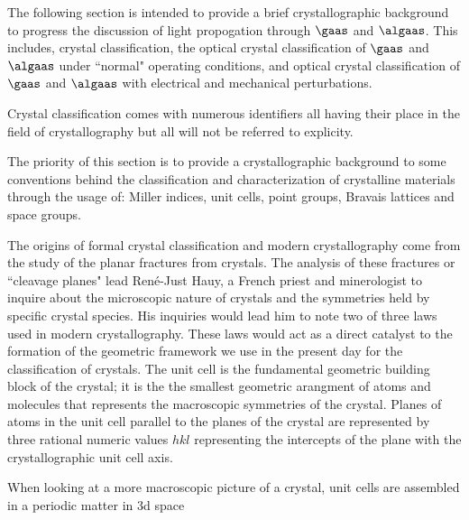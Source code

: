 The following section is intended to provide a brief crystallographic background to progress the discussion of light propogation through $\gaas$ and $\algaas$. This includes, crystal classification, the optical crystal classification of $\gaas$ and $\algaas$ under ``normal" operating conditions, and optical crystal classification of $\gaas$  and $\algaas$ with electrical and mechanical perturbations.

Crystal classification comes with numerous identifiers all having their place in the field of crystallography but all will not be referred to explicity.

The priority of this section is to provide a crystallographic background to some conventions behind the classification and characterization of crystalline materials through the usage of: Miller indices, unit cells, point groups, Bravais lattices and space groups.

The origins of formal crystal classification and modern crystallography come from the study of the planar fractures from crystals. The analysis of these fractures or ``cleavage planes" lead René-Just Hauy, a French priest and minerologist to inquire about the microscopic nature of crystals and the symmetries held by specific crystal species. His inquiries would lead him to note two of three laws used in modern crystallography. These laws would act as a direct catalyst to the formation of the geometric framework we use in the present day for the classification of crystals.
The unit cell is the fundamental geometric building block of the crystal; it is the the smallest geometric arangment of atoms and molecules that represents the macroscopic symmetries of the crystal. Planes of atoms in the unit cell parallel to the planes of the crystal are represented by three rational numeric values ${hkl}$ representing the intercepts of the plane with the crystallographic unit cell axis.


When looking at a more macroscopic picture of a crystal, unit cells are assembled in a periodic matter in 3d space


